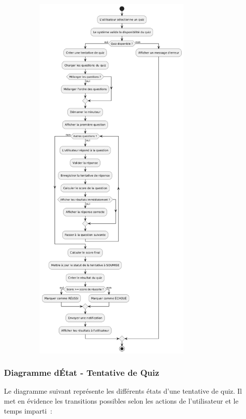 \documentclass[12pt,a4paper,twoside]{report}
\begin{document}
\includegraphics[width=4.53403in,height=7.32986in]{latex_media/media/image20.png}

\hypertarget{diagramme-duxe9tat---tentative-de-quiz}{%
\subsubsection{Diagramme d\textquotesingle État - Tentative de
Quiz}\label{diagramme-duxe9tat---tentative-de-quiz}}

Le diagramme suivant représente les différents états d'une tentative de
quiz. Il met en évidence les transitions possibles selon les actions de
l'utilisateur et le temps imparti~:

\hypertarget{section-4}{%
\subsubsection{}\label{section-4}}
\end{document}
